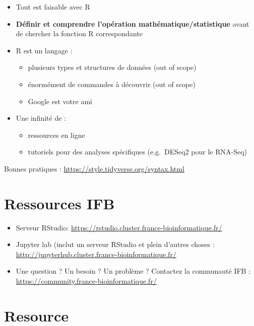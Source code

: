 \documentclass[
]{book}
\providecommand{\tightlist}{%
  \setlength{\itemsep}{0pt}\setlength{\parskip}{0pt}}
\begin{document}
\begin{itemize}
\tightlist
\item
  Tout est faisable avec R
\item
  \textbf{Définir et comprendre l'opération mathématique/statistique} avant de chercher la fonction R correspondante
\item
  R est un langage :

  \begin{itemize}
  \tightlist
  \item
    plusieurs types et structures de données (out of scope)
  \item
    énormément de commandes à découvrir (out of scope)
  \item
    Google est votre ami
  \end{itemize}
\item
  Une infinité de :

  \begin{itemize}
  \tightlist
  \item
    ressources en ligne
  \item
    tutoriels pour des analyses spécifiques (e.g.~DESeq2 pour le RNA-Seq)
  \end{itemize}
\end{itemize}

Bonnes pratiques : \url{https://style.tidyverse.org/syntax.html}

\hypertarget{ressources-ifb}{%
\section{Ressources IFB}\label{ressources-ifb}}

\begin{itemize}
\tightlist
\item
  Serveur RStudio: \url{https://rstudio.cluster.france-bioinformatique.fr/}
\item
  Jupyter lab (inclut un serveur RStudio et plein d'autres choses : \url{http://jupyterhub.cluster.france-bioinformatique.fr/}
\item
  Une question ? Un besoin ? Un problème ? Contactez la communauté IFB : \url{https://community.france-bioinformatique.fr/}
\end{itemize}

\hypertarget{resource}{%
\section{Resource}\label{resource}}
\end{document}
